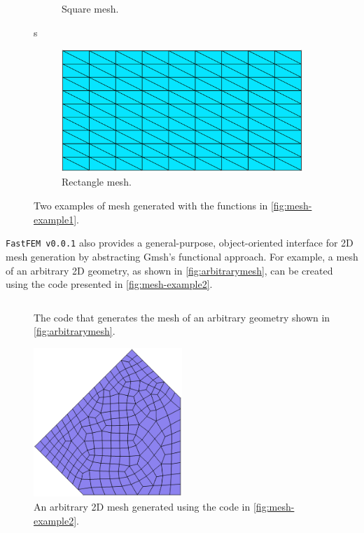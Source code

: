 \documentclass[headings=standardclasses, abstract=true]{scrartcl}
\newcommand{\pythonCodeBlock}[3]{%
    \begin{figure}
        \centering
        \begin{pythonbox}
            \inputminted[fontfamily=VSCode, baselinestretch=0.8]{python}{#1}
        \end{pythonbox}
        \caption{#2}
        \label{#3}
    \end{figure}
}
\begin{document}
\begin{figure}[H]
\begin{subfigure}[c]{0.4\textwidth}
        \caption{Square mesh.}
        \label{fig:square}
    \end{subfigure}s
    \hspace{0.1\textwidth}
    \begin{subfigure}[c]{0.4\textwidth}
        \centering
        \includegraphics[width=\textwidth]{figures/rectangle_mesh.png}
        \caption{Rectangle mesh.}
        \label{fig:rectangle}
    \end{subfigure}
    \caption{Two examples of mesh generated with the functions in \autoref{fig:mesh-example1}.}
    \label{fig:mesh}
    \hfill
\end{figure}

\texttt{FastFEM v0.0.1} also provides a general-purpose, object-oriented interface for 2D mesh generation by abstracting Gmsh's functional approach. For example, a mesh of an arbitrary 2D geometry, as shown in \autoref{fig:arbitrarymesh}, can be created using the code presented in \autoref{fig:mesh-example2}.

\pythonCodeBlock{figures/mesher-example2.py}{The code that generates the mesh of an arbitrary geometry shown in \autoref{fig:arbitrarymesh}.}{fig:mesh-example2}

\begin{figure}[H]
    \centering
    \includegraphics[width=0.5\textwidth]{figures/arbitrary_mesh.png}
    \caption{An arbitrary 2D mesh generated using the code in \autoref{fig:mesh-example2}.}
    \label{fig:arbitrarymesh}
\end{figure}
\end{document}
